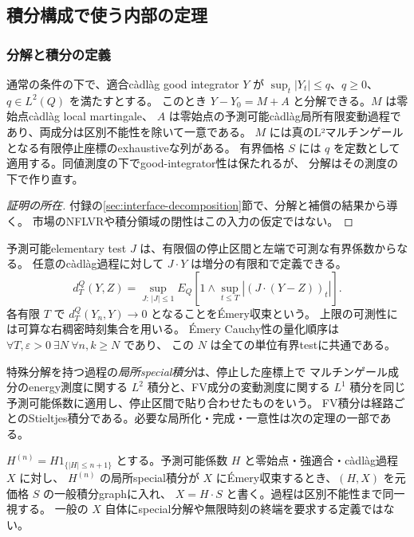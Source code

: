 \subsection{積分構成で使う内部の定理}
\label{sec:integral-background}
\subsubsection{分解と積分の定義}
\begin{theorem}[包絡を持つ過程の分解]\label{thm:decomposition-input}
通常の条件の下で、適合càdlàg good integrator $Y$ が
$\sup_t|Y_t|\leq q$、$q\geq0$、$q\in L^2(Q)$ を満たすとする。
このとき $Y-Y_0=M+A$ と分解できる。$M$ は零始点càdlàg local martingale、
$A$ は零始点の予測可能càdlàg局所有限変動過程であり、両成分は区別不能性を除いて一意である。
$M$ には真のL²マルチンゲールとなる有限停止座標のexhaustiveな列がある。
有界価格 $S$ には $q$ を定数として適用する。同値測度の下でgood-integrator性は保たれるが、
分解はその測度の下で作り直す。
\end{theorem}
\begin{proof}[証明の所在]
付録の\ref{sec:interface-decomposition}節で、分解と補償の結果から導く。
市場のNFLVRや積分領域の閉性はこの入力の仮定ではない。
\end{proof}

予測可能elementary test $J$ は、有限個の停止区間と左端で可測な有界係数からなる。
任意のcàdlàg過程に対して $J\cdot Y$ は増分の有限和で定義できる。
\[
 d_T^Q(Y,Z)=\sup_{J:\,|J|\leq1}
 E_Q\left[1\wedge\sup_{t\leq T}|(J\cdot(Y-Z))_t|\right].
\]
各有限 $T$ で $d_T^Q(Y_n,Y)\to0$ となることをÉmery収束という\cite{Emery79}。
上限の可測性には可算な右稠密時刻集合を用いる。
Émery Cauchy性の量化順序は $\forall T,\varepsilon>0\ \exists N\ \forall n,k\geq N$ であり、
この $N$ は全ての単位有界testに共通である。

特殊分解を持つ過程の\emph{局所special積分}は、停止した座標上で
マルチンゲール成分のenergy測度に関する $L^2$ 積分と、FV成分の変動測度に関する
$L^1$ 積分を同じ予測可能係数に適用し、停止区間で貼り合わせたものをいう。
FV積分は経路ごとのStieltjes積分である。必要な局所化・完成・一意性は次の定理の一部である。

\begin{definition}[一般積分graph]\label{def:general-graph}
$H^{(n)}=H1_{\{|H|\leq n+1\}}$ とする。予測可能係数 $H$ と零始点・強適合・càdlàg過程 $X$ に対し、
$H^{(n)}$ の局所special積分が $X$ にÉmery収束するとき、$(H,X)$ を元価格 $S$ の一般積分graphに入れ、
$X=H\cdot S$ と書く。過程は区別不能性まで同一視する。
一般の $X$ 自体にspecial分解や無限時刻の終端を要求する定義ではない。
\end{definition}

